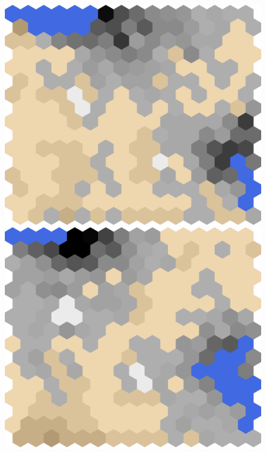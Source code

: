\documentclass[conference]{IEEEtran}
\theoremstyle{definition}
\begin{document}
\begin{figure}
	\begin{minipage}{.19\textwidth}
		\centering
		\includegraphics[width=\textwidth]{tf-f}
	\end{minipage}
	\begin{minipage}{.19\textwidth}
		\centering
		\includegraphics[width=\textwidth]{tf-g}
	\end{minipage}
	\begin{minipage}{.19\textwidth}
		\centering

\end{minipage}
\end{figure}
\end{document}
